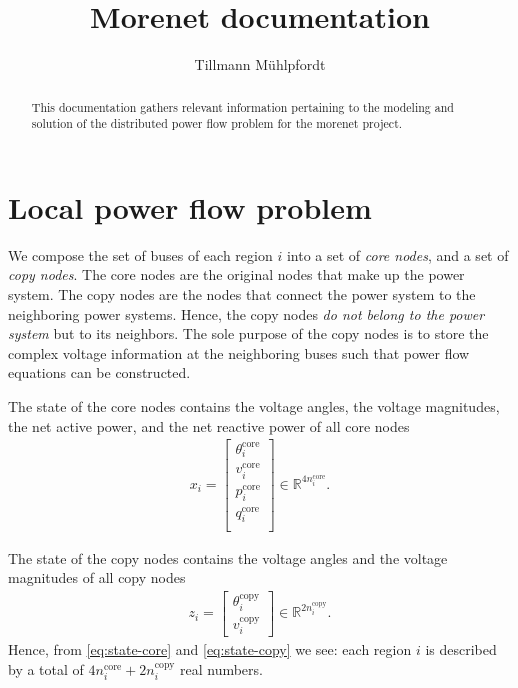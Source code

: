 \documentclass{article}
\title{Morenet documentation}
\author{Tillmann Mühlpfordt}
\newcommand{\ncore}{n^\text{core}}
\newcommand{\ncopy}{n^\text{copy}}
\newcommand{\stateCore}{x}
\newcommand{\stateCopy}{z}
\begin{document}
\maketitle

\begin{abstract}
This documentation gathers relevant information pertaining to the modeling and solution of the distributed power flow problem for the morenet project.
\end{abstract}

\section{Local power flow problem}
We compose the set of buses of each region $i$ into a set of \emph{core nodes}, and a set of \emph{copy nodes}.
The core nodes are the original nodes that make up the power system.
The copy nodes are the nodes that connect the power system to the neighboring power systems.
Hence, the copy nodes \emph{do not belong to the power system} but to its neighbors.
The sole purpose of the copy nodes is to store the complex voltage information at the neighboring buses such that power flow equations can be constructed.

The state of the core nodes contains the voltage angles, the voltage magnitudes, the net active power, and the net reactive power of all core nodes
\begin{align}
    \label{eq:state-core}
    \stateCore_i = \begin{bmatrix}
        \theta_i^\text{core} \\
        v_i^\text{core} \\
        p_i^\text{core} \\
        q_i^\text{core} \\
    \end{bmatrix}
    \in \mathbb{R}^{4 \ncore_i}.
\end{align}

The state of the copy nodes contains the voltage angles and the voltage magnitudes of all copy nodes
\begin{align}
    \label{eq:state-copy}
    \stateCopy_i = \begin{bmatrix}
        \theta_i^\text{copy} \\
        v_i^\text{copy}
    \end{bmatrix}
    \in \mathbb{R}^{2 \ncopy_i}.
\end{align}
Hence, from \eqref{eq:state-core} and \eqref{eq:state-copy} we see: each region $i$ is described by a total of $4 \ncore_i + 2 \ncopy_i$ real numbers.
\end{document}
